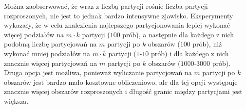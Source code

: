 Można zaobserwować, że wraz z liczbą partycji rośnie liczba partycji rozproszonych, nie jest to jednak bardzo intensywne
zjawisko.
Eksperymenty wykazały, że w celu znalezienia najlepszego partycjonowania lepiej wykonać więcej
podziałów na $m \cdot k$ partycji ($100$ prób), a następnie
dla każdego z nich podobną liczbę partycjowań na $m$ partycji po $k$ obszarów ($100$ prób),
niż wykonać mniej podziałów na $m \cdot k$ partycji ($1$-$10$ prób) i dla każdego
z nich znacznie więcej partycjowań na $m$ partycji po $k$ obszarów ($1000$-$3000$ prób).
Druga opcja jest możliwa, ponieważ wyliczanie partycjowań na $m$ partycji po $k$ obszarów jest bardzo mało kosztowne
obliczeniowo, ale dla tej opcji występuje znacznie więcej obszarów rozproszonych i długość granic między partycjami
jest większa.


\begin{figure}[h]
\centering
\begin{subfigure}{.33\textwidth}
    \centering
    \caption[short]{}
\end{subfigure}%
\begin{subfigure}{.33\textwidth}
    \centering

\end{subfigure}
\end{figure}

